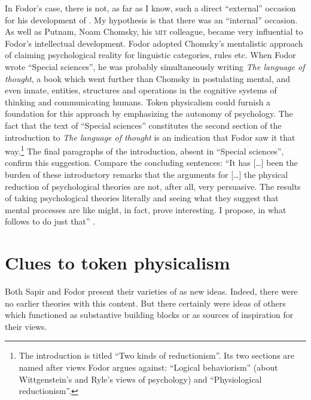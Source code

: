 \documentclass[output=paper]{langscibook}
\begin{document}
In Fodor's case, there is not, as far as I know, such a direct ``external'' occasion for his development of . My hypothesis is that there was an ``internal'' occasion. As well as Putnam, Noam Chomsky, his \textsc{mit} colleague, became very influential to Fodor's intellectual development. Fodor adopted Chomsky's mentalistic approach of claiming psychological reality for linguistic categories, rules etc. When Fodor wrote ``Special sciences'', he was probably simultaneously writing \emph{The language of thought}, a book which went further than Chomsky in postulating mental, and even innate, entities, structures and operations in the cognitive systems of thinking and communicating humans. Token physicalism could furnish a foundation for this approach by emphasizing the autonomy of psychology. The fact that the text of ``Special sciences'' constitutes the second section of the introduction to \emph{The language of thought} is an indication that Fodor saw it that way.\footnote{The introduction is titled ``Two kinds of reductionism''. Its two sections are named after views Fodor argues against: ``Logical behaviorism'' (about Wittgenstein's and Ryle's views of psychology) and ``Physiological reductionism''.} The final paragraphs of the introduction, absent in ``Special sciences'', confirm this suggestion. Compare the concluding sentences: ``It has […] been the burden of these introductory remarks that the arguments for […] the physical reduction of psychological theories are not, after all, very persuasive. The results of taking psychological theories literally and seeing what they suggest that mental processes are like might, in fact, prove interesting. I propose, in what follows to do just that'' \citep[26]{Fodor1975}.

\section{Clues to token physicalism}
\label{sec:elffers:clues}

Both Sapir and Fodor present their varieties of  as new ideas. Indeed, there were no earlier theories with this content. But there certainly were ideas of others which functioned as substantive building blocks or as sources of inspiration for their views.
\end{document}
